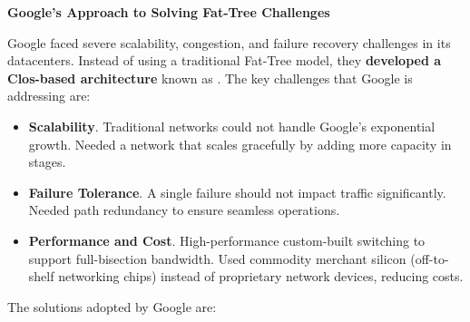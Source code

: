 \highspace
\begin{flushleft}
    \textcolor{Green3}{ \textbf{Google's Approach to Solving Fat-Tree Challenges}}
\end{flushleft}
Google faced severe scalability, congestion, and failure recovery challenges in its datacenters. Instead of using a traditional Fat-Tree model, they \textbf{developed a Clos-based architecture} known as . The key challenges that Google is addressing are:
\begin{itemize}
    \item \textbf{Scalability}. Traditional networks could not handle Google's exponential growth. Needed a network that scales gracefully by adding more capacity in stages.
    \item \textbf{Failure Tolerance}. A single failure should not impact traffic significantly. Needed path redundancy to ensure seamless operations.
    \item \textbf{Performance and Cost}. High-performance custom-built switching to support full-bisection bandwidth. Used commodity merchant silicon (off-to-shelf networking chips) instead of proprietary network devices, reducing costs.
\end{itemize}
The solutions adopted by Google are:
